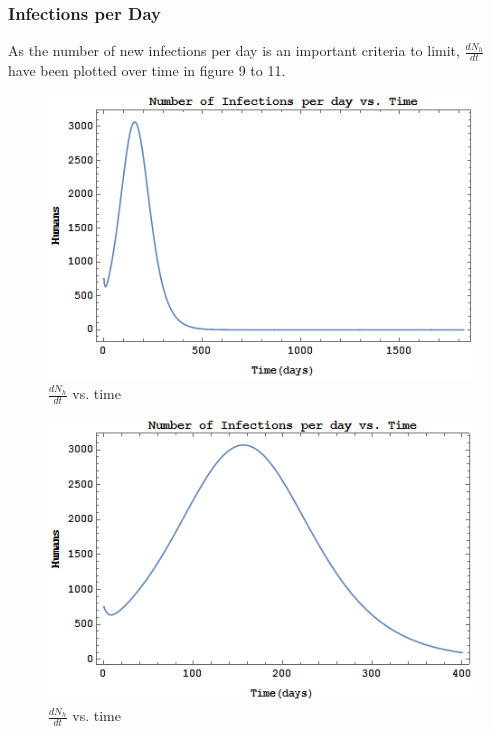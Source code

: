 \documentclass{article}
\begin{document}
\subsubsection{Infections per Day}
As the number of new infections per day is an important criteria to limit, $\frac{dN_h}{dt}$ have been plotted over time in figure 9 to 11. \\
\begin{figure}[h!]
  \includegraphics[width=\linewidth]{dNdtVst}
  \caption{$\frac{dN_h}{dt}$ vs. time}
  \label{fig:dndtvst}
\end{figure}

\begin{figure}[h!]
  \includegraphics[width=\linewidth]{dNdtVst-tmax=400}
  \caption{$\frac{dN_h}{dt}$ vs. time}
  \label{fig:dndtvst400}
\end{figure}
\end{document}
